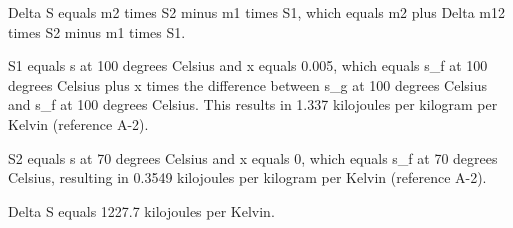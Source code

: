 Delta S equals m2 times S2 minus m1 times S1, which equals m2 plus Delta m12 times S2 minus m1 times S1.

S1 equals s at 100 degrees Celsius and x equals 0.005, which equals s_f at 100 degrees Celsius plus x times the difference between s_g at 100 degrees Celsius and s_f at 100 degrees Celsius. This results in 1.337 kilojoules per kilogram per Kelvin (reference A-2).

S2 equals s at 70 degrees Celsius and x equals 0, which equals s_f at 70 degrees Celsius, resulting in 0.3549 kilojoules per kilogram per Kelvin (reference A-2).

Delta S equals 1227.7 kilojoules per Kelvin.